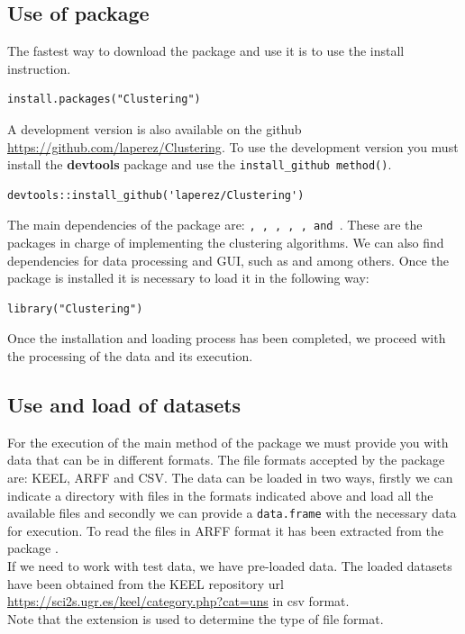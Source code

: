 \subsection{Use of  package}

The fastest way to download the  package and use it is to use the install instruction.

\begin{verbatim}
install.packages("Clustering")
\end{verbatim}

A development version is also available on the github \url{https://github.com/laperez/Clustering}. To use the development version you must install the \textbf{devtools} package and use the \texttt{install\_github method()}.

\begin{verbatim}
devtools::install_github('laperez/Clustering')
\end{verbatim}

The main dependencies of the   package are: \texttt{, , , , ,  and }. These are the packages in charge of implementing the clustering algorithms. We can also find dependencies for data processing and GUI, such as \texttt{} and \texttt{} among others. Once the package is installed it is necessary to load it in the following way:

\begin{verbatim}
library("Clustering")
\end{verbatim}

Once the installation and loading process has been completed, we proceed with the processing of the data and its execution.

\subsection {Use and load of datasets}

For the execution of the main method of the package we must provide you with data that can be in different formats. The file formats accepted by the package are: KEEL, ARFF and CSV. The data can be loaded in two ways, firstly we can indicate a directory with files in the formats indicated above and load all the available files and secondly we can provide a \texttt{data.frame} with the necessary data for execution. To read the files in ARFF format it has been extracted from the  package \citep{b55}.\\
If we need to work with test data, we have pre-loaded data. The loaded datasets have been obtained from the KEEL repository url \url{https://sci2s.ugr.es/keel/category.php?cat=uns} in csv format.\\
Note that the extension is used to determine the type of file format.

